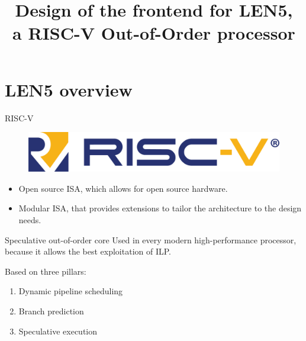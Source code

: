 \documentclass{beamer}
\title{Design of the frontend for LEN5,\\a RISC-V Out-of-Order processor}
\begin{document}
\begin{frame}[plain]
  \maketitle
\end{frame}
\addtocounter{framenumber}{-1}

\section{LEN5 overview}

\begin{frame}{RISC-V}
  \begin{figure}
    \centering
    \includegraphics[width=.7\textwidth]{img/riscv.png}
  \end{figure}

  \begin{itemize}[<+->]
    \item Open source ISA, which allows for open source hardware.
    \item Modular ISA, that provides extensions to tailor the architecture to the design needs.
  \end{itemize}
\end{frame}

\begin{frame}{Speculative out-of-order core}
  Used in every modern high-performance processor, because it allows the best exploitation of ILP.
  \pause

  Based on three pillars:
  \begin{enumerate}[<+->]
    \item Dynamic pipeline scheduling
    \item Branch prediction
    \item Speculative execution
  \end{enumerate}
\end{frame}
\end{document}

